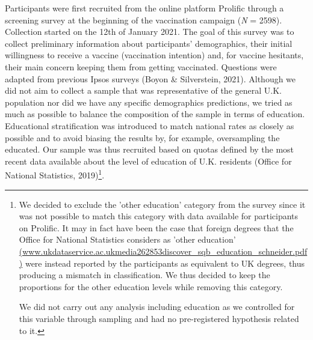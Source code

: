 \documentclass[authordate, empirical]{jote-new-article}
\begin{document}
Participants were first recruited from the online platform Prolific through a screening survey at the beginning of the vaccination campaign (\emph{N }= 2598). Collection started on the 12th of January 2021. The goal of this survey was to collect preliminary information about participants' demographics, their initial willingness to receive a vaccine (vaccination intention) and, for vaccine hesitants, their main concern keeping them from getting vaccinated. Questions were adapted from previous Ipsos surveys (Boyon \& Silverstein, 2021). Although we did not aim to collect a sample that was representative of the general U.K. population nor did we have any specific demographics predictions, we tried as much as possible to balance the composition of the sample in terms of education. Educational stratification was introduced to match national rates as closely as possible and to avoid biasing the results by, for example, oversampling the educated. Our sample was thus recruited based on quotas defined by the most recent data available about the level of education of U.K. residents (Office for
National Statistics, 2019)\footnote{We decided to exclude the 'other education' category from the survey since it was not possible to match this category with data available for participants on Prolific. It may in fact have been the case that foreign degrees that the Office for National Statistics considers as 'other education' \href{https://www.ukdataservice.ac.uk/media/262853/discover_sqb_education_schneider.pdf}{(www.ukdataservice.ac.ukmedia262853discover\_sqb\_education\_schneider.pdf)} were instead reported by the participants as equivalent to UK degrees, thus producing a mismatch in classification. We thus decided to keep the proportions for the other education levels while removing this category.\par We did not carry out any analysis including education as we controlled for this variable through sampling and had no pre-registered hypothesis related to it.}.
\end{document}
